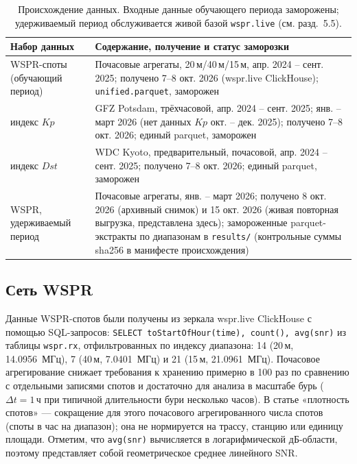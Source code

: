 \documentclass{agujournal2019}
\begin{document}
\begin{table}[h]
	\centering
	\footnotesize
	\setlength{\tabcolsep}{4pt}
	\caption{Происхождение данных. Входные данные обучающего периода
		заморожены; удерживаемый период обслуживается живой базой
		\texttt{wspr.live} (см. разд.~5.5).}
	\label{tab:provenance}
	\begin{tabularx}{\textwidth}{@{}>{\raggedright\arraybackslash}p{4.0cm} >{\raggedright\arraybackslash}X@{}}
		\toprule
		Набор данных & Содержание, получение и статус заморозки \\
		\midrule
		WSPR-споты (обучающий период) &
		Почасовые агрегаты, 20\,м/40\,м/15\,м, апр. 2024 -- сент. 2025;
		получено 7--8 окт. 2026 (wspr.live ClickHouse);
		\mbox{\texttt{unified.parquet}}, заморожен \\
		индекс $Kp$ &
		GFZ Potsdam, трёхчасовой, апр. 2024 -- сент. 2025; янв. -- март 2026
		(нет данных $Kp$ окт. -- дек. 2025); получено 7--8 окт. 2026; единый parquet, заморожен \\
		индекс $Dst$ &
		WDC Kyoto, предварительный, почасовой, апр. 2024 -- сент. 2025;
		получено 7--8 окт. 2026; единый parquet, заморожен \\
		WSPR, удерживаемый период &
		Почасовые агрегаты, янв. -- март 2026; получено 8 окт. 2026
		(архивный снимок) и 15 окт. 2026 (живая повторная выгрузка,
		представлена здесь); замороженные parquet-экстракты по диапазонам
		в \mbox{\texttt{results/}} (контрольные суммы sha256 в манифесте
		происхождения) \\
		\bottomrule
	\end{tabularx}
\end{table}

\subsection{Сеть WSPR}

Данные WSPR-спотов были получены из зеркала wspr.live ClickHouse с помощью
SQL-запросов: \texttt{SELECT toStartOfHour(time), count(), avg(snr)} из
таблицы \texttt{wspr.rx}, отфильтрованных по индексу диапазона: 14 (20\,м,
\SI{14.0956}{\mbox{МГц}}), 7 (40\,м, \SI{7.0401}{\mbox{МГц}}) и 21 (15\,м,
\SI{21.0961}{\mbox{МГц}}). Почасовое агрегирование снижает требования к хранению
примерно в 100 раз по сравнению с отдельными записями спотов и достаточно
для анализа в масштабе бурь ($\Delta t = 1$\,ч при типичной длительности
бури несколько часов). В статье «плотность спотов» — сокращение для этого
почасового агрегированного числа спотов (споты в час на диапазон); она
не нормируется на трассу, станцию или единицу площади. Отметим, что
\texttt{avg(snr)} вычисляется в логарифмической дБ-области, поэтому
представляет собой геометрическое среднее линейного SNR.
\end{document}
